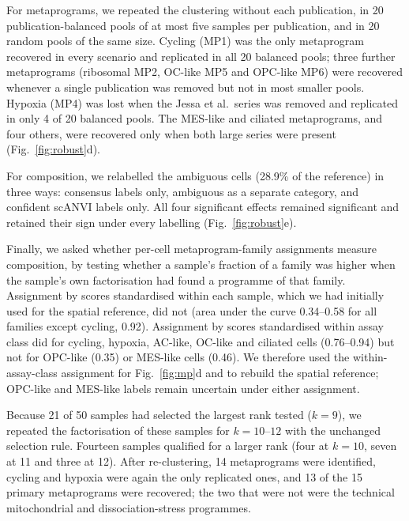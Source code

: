 \documentclass[11pt,a4paper]{article}
\begin{document}
For metaprograms, we repeated the clustering without each publication, in 20 publication-balanced pools of at most five
samples per publication, and in 20 random pools of the same size. Cycling (MP1) was the only metaprogram recovered in every scenario and replicated in
all 20 balanced pools; three further metaprograms (ribosomal MP2, OC-like MP5 and OPC-like MP6) were recovered whenever a
single publication was removed but not in most smaller pools. Hypoxia (MP4) was lost when the Jessa et al.\ series was removed and replicated in
only 4 of 20 balanced pools. The MES-like and ciliated metaprograms, and four others, were recovered only when both large
series were present (Fig.~\ref{fig:robust}d).

For composition, we relabelled the ambiguous cells (28.9\% of the reference) in three ways: consensus labels only, ambiguous as a
separate category, and confident scANVI labels only. All four significant effects remained significant and retained
their sign under every labelling (Fig.~\ref{fig:robust}e).

Finally, we asked whether per-cell metaprogram-family assignments measure composition, by testing whether a sample's
fraction of a family was higher when the sample's own factorisation had found a programme of that family. Assignment by
scores standardised within each sample, which we had initially used for the spatial reference, did not (area under
the curve 0.34--0.58 for all families except cycling, 0.92). Assignment by scores standardised within assay class did for
cycling, hypoxia, AC-like, OC-like and ciliated cells (0.76--0.94) but not for OPC-like (0.35) or MES-like cells (0.46).
We therefore used the within-assay-class assignment for
Fig.~\ref{fig:mp}d and to rebuild the spatial reference; OPC-like and MES-like labels remain uncertain under either
assignment.

Because 21 of 50 samples had selected the largest rank tested ($k = 9$), we repeated the factorisation of these samples
for $k = 10$--$12$ with the unchanged selection rule. Fourteen samples qualified for a larger rank (four at $k = 10$, seven
at 11 and three at 12). After re-clustering, 14 metaprograms were identified, cycling and hypoxia were again the only
replicated ones, and 13 of the 15 primary metaprograms were recovered; the two that were not were the technical
mitochondrial and dissociation-stress programmes.
\end{document}
